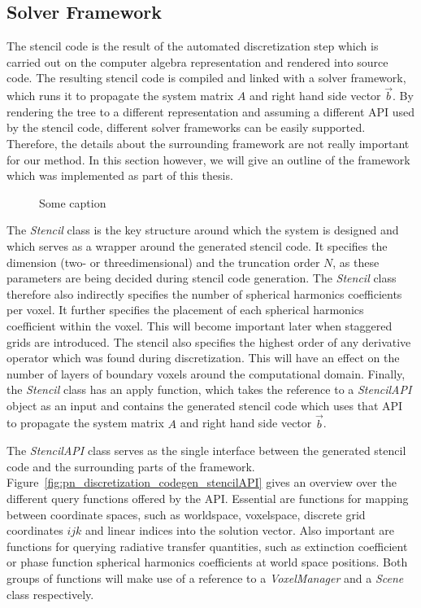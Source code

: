 \subsection{Solver Framework}
\label{sec:pn_framework}

The stencil code is the result of the automated discretization step which is carried out on the computer algebra representation and rendered into source code. The resulting stencil code is compiled and linked with a solver framework, which runs it to propagate the system matrix $A$ and right hand side vector $\vec{b}$. By rendering the tree to a different representation and assuming a different API used by the stencil code, different solver frameworks can be easily supported.
Therefore, the details about the surrounding framework are not really important for our method. In this section however, we will give an outline of the framework which was implemented as part of this thesis.
\begin{figure}[h]
\centering
{}
\caption{Some caption}
\label{fig:pn_classes}
\end{figure}

The \emph{Stencil} class is the key structure around which the system is designed and which serves as a wrapper around the generated stencil code. It specifies the dimension (two- or threedimensional) and the truncation order $N$, as these parameters are being decided during stencil code generation. The \emph{Stencil} class therefore also indirectly specifies the number of spherical harmonics coefficients per voxel. It further specifies the placement of each spherical harmonics coefficient within the voxel. This will become important later when staggered grids are introduced. The stencil also specifies the highest order of any derivative operator which was found during discretization. This will have an effect on the number of layers of boundary voxels around the computational domain. Finally, the \emph{Stencil} class has an apply function, which takes the reference to a \emph{StencilAPI} object as an input and contains the generated stencil code which uses that API to propagate the system matrix $A$ and right hand side vector $\vec{b}$.

The \emph{StencilAPI} class serves as the single interface between the generated stencil code and the surrounding parts of the framework. Figure~\ref{fig:pn_discretization_codegen_stencilAPI} gives an overview over the different query functions offered by the API. Essential are functions for mapping between coordinate spaces, such as worldspace, voxelspace, discrete grid coordinates $ijk$ and linear indices into the solution vector. Also important are functions for querying radiative transfer quantities, such as extinction coefficient or phase function spherical harmonics coefficients at world space positions. Both groups of functions will make use of a reference to a \emph{VoxelManager} and a \emph{Scene} class respectively.

